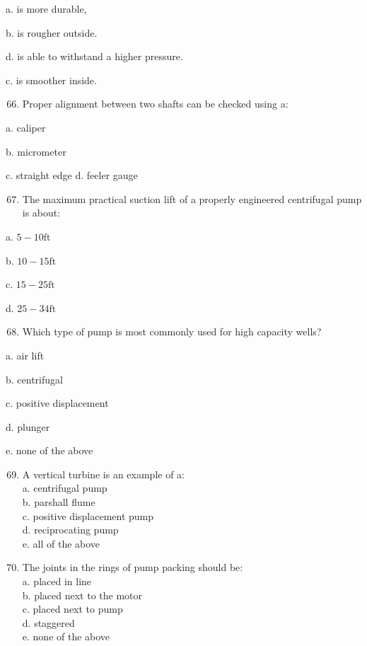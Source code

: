 \documentclass[10pt]{article}
\begin{document}
\begin{enumerate}
\begin{enumerate}
a. is more durable,

b. is rougher outside.

d. is able to withstand a higher pressure.

c. is smoother inside.

\begin{enumerate}
  \setcounter{enumi}{65}
  \item Proper alignment between two shafts can be checked using a:
\end{enumerate}

a. caliper

b. micrometer

c. straight edge d. feeler gauge

\begin{enumerate}
  \setcounter{enumi}{66}
  \item The maximum practical suction lift of a properly engineered centrifugal pump is about:
\end{enumerate}

a. $5-10 \mathrm{ft}$

b. $10-15 \mathrm{ft}$

c. $15-25 \mathrm{ft}$

d. $25-34 \mathrm{ft}$

\begin{enumerate}
  \setcounter{enumi}{67}
  \item Which type of pump is most commonly used for high capacity wells?
\end{enumerate}

a. air lift

b. centrifugal

c. positive displacement

d. plunger

e. none of the above

\begin{enumerate}
  \setcounter{enumi}{68}
  \item A vertical turbine is an example of a:\\
a. centrifugal pump\\
b. parshall flume\\
c. positive displacement pump\\
d. reciprocating pump\\
e. all of the above

  \item The joints in the rings of pump packing should be:\\
a. placed in line\\
b. placed next to the motor\\
c. placed next to pump\\
d. staggered\\
e. none of the above


\end{enumerate}
\end{enumerate}
\end{enumerate}
\end{document}
